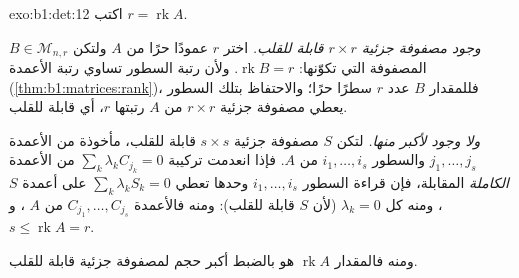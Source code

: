 \begin{solution}{exo:b1:det:12}
اكتب $r = \operatorname{rk} A$.

\emph{وجود مصفوفة جزئية $r \times r$ قابلة للقلب.} اختر $r$
عمودًا حرًا من $A$ ولتكن $B \in \mathcal{M}_{n,r}$
المصفوفة التي تكوّنها: $\operatorname{rk} B = r$. ولأن رتبة السطور
تساوي رتبة الأعمدة (\cref{thm:b1:matrices:rank})، فللمقدار $B$ عدد $r$
سطرًا حرًا؛ والاحتفاظ بتلك السطور يعطي مصفوفة جزئية $r \times r$
من $A$ رتبتها $r$، أي قابلة للقلب.

\emph{ولا وجود لأكبر منها.} لتكن $S$ مصفوفة جزئية $s \times s$
قابلة للقلب، مأخوذة من الأعمدة $j_1, \dots, j_s$ والسطور $i_1,
\dots, i_s$ من $A$. فإذا انعدمت تركيبة $\sum_k \lambda_k
C_{j_k} = 0$ من الأعمدة \emph{الكاملة} المقابلة،
فإن قراءة السطور $i_1, \dots, i_s$ وحدها تعطي $\sum_k
\lambda_k S_k = 0$ على أعمدة $S$، ومنه كل $\lambda_k = 0$
(لأن $S$ قابلة للقلب): ومنه فالأعمدة $C_{j_1}, \dots, C_{j_s}$ من $A$
، و $s \leq \operatorname{rk} A = r$.

ومنه فالمقدار $\operatorname{rk} A$ هو بالضبط أكبر حجم لمصفوفة
جزئية قابلة للقلب.
\end{solution}

